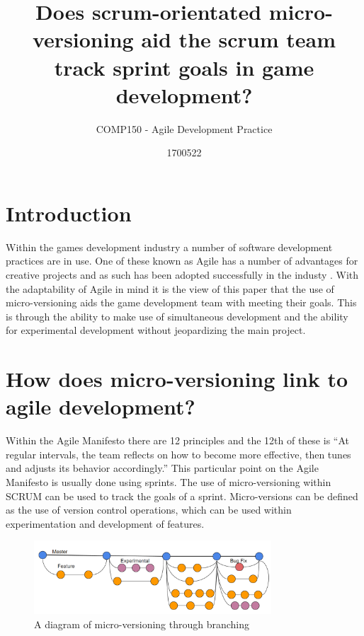 \documentclass{scrartcl}
\title{Does scrum-orientated micro-versioning aid the scrum team track sprint goals in game development?}
\subtitle{COMP150 - Agile Development Practice}
\author{1700522}
\begin{document}
\maketitle


\section{Introduction}
Within the games development industry a number of software development practices are in use. One of these known as Agile has a number of advantages for creative projects and as such has been adopted successfully in the industy \cite{AgileGameDevelopmentCKeith}. With the adaptability of Agile in mind it is the view of this paper that the use of micro-versioning aids the game development team with meeting their goals. This is through the ability to make use of simultaneous development and the ability for experimental development without jeopardizing the main project.

\section{How does micro-versioning link to agile development?}
Within the Agile Manifesto there are 12 principles and the 12th of these is ``At regular intervals, the team reflects on how to become more effective, then tunes and adjusts 
its behavior accordingly.''\cite{AgileManifesto} This particular point on the Agile Manifesto is usually done using sprints\cite{AdoptingScrum}. The use of micro-versioning within SCRUM can be used to track the goals of a sprint. Micro-versions can be defined as the use of version control operations, which can be used within experimentation and development of features\cite{mikami2017micro}.

\begin{figure}[h!]
	\begin{center}
	\includegraphics [width=0.79\textwidth,inner]{Micro-VersioningExampleDiagram}
	\caption{A diagram of micro-versioning through branching}
	\label{MicroVersioningDiagram}
	\end{center}
\end{figure}
\end{document}

